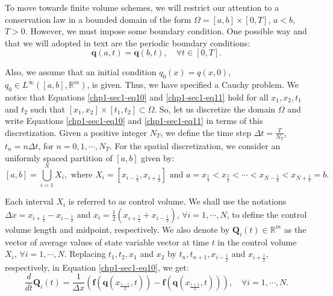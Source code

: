 To move towards finite volume schemes, we will restrict our attention
to a conservation law in a bounded domain of the form 
$\Omega = [a,b]\times[0,T]$, $a<b$, $T>0$. However, we must 
impose some boundary condition. One possible way and that we will adopted 
in text are the periodic boundary conditions:
\begin{equation}
        \label{chp1-sec1-eq12}
	\mathbf{q}(a, t) = \mathbf{q}(b, t),\quad \forall t \in [0, T].
\end{equation}

Also, we assume that an initial condition $q_0(x) = q(x,0)$, $q_0 \in L^{\infty}([a,b],\mathbb{R}^m)$, is given.
Thus, we have specified a Cauchy problem.
We notice that Equations \eqref{chp1-sec1-eq10} and \eqref{chp1-sec1-eq11}
hold for all $x_1, x_2, t_1$ and $t_2$ such that
$[x_1, x_2] \times [t_1, t_2] \subset \Omega$.
So, let us discretize the domain $\Omega$ and write 
Equations \eqref{chp1-sec1-eq10} and \eqref{chp1-sec1-eq11} in terms of this discretization.
Given a positive integer $N_T$, we define the time step 
$\Delta t = \frac{T}{N_T}$, $t_n = n \Delta t$, for $n = 0, 1 ,\cdots, N_T$.
For the spatial discretization, we consider an uniformly spaced partition of $[a, b]$ given by: 
\begin{equation}
	\label{chp1-sec1-eq13}
	[a,b] = \bigcup_{i=1}^N X_i, 
	\text{ where } X_i= [x_{i-\frac{1}{2}}, x_{i+\frac{1}{2}}] \text{ and } 
	a = x_{\frac{1}{2}} < x_{\frac{3}{2}} < \cdots < x_{N-\frac{1}{2}} < x_{N+\frac{1}{2}} = b.
\end{equation}

Each interval $X_i$ is referred to as control volume. 
We shall use the notations $\Delta x = x_{i+\frac{1}{2}} - x_{i-\frac{1}{2}}$ 
and $x_i = \frac{1}{2}(x_{i+\frac{1}{2}} + x_{i-\frac{1}{2}})$, $\forall i = 1, \cdots, N$, 
to define the control volume length and midpoint, respectively.
We also denote by $\mathbf{Q}_i(t) \in \mathbb{R}^m$ as the vector of 
average values of state variable vector at time $t$
in the control volume $X_i$, $\forall i = 1, \cdots, N$. Replacing $t_1, t_2, x_1$ and 
$x_2$ by $t_{n}, t_{n+1}, x_{i-\frac{1}{2}}$ and $x_{i+\frac{1}{2}}$,
respectively, in Equation \eqref{chp1-sec1-eq10}, we get:
\begin{equation}
        \label{chp1-sec1-eq14}
	\frac{d}{dt} \mathbf{Q}_i(t) = \frac{1}{\Delta x}
	(\mathbf{f}(\mathbf{q}(x_{\frac{i-1}{2}},t)) -
	\mathbf{f}(\mathbf{q}(x_{\frac{i+1}{2}},t))) ,
	\quad \forall i = 1, \cdots, N.
\end{equation}

